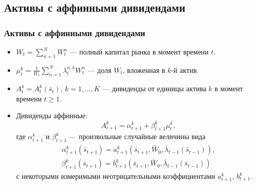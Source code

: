 \documentclass[10pt]{beamer}
\theoremstyle{definition}
\theoremstyle{remark}
\begin{document}
\subsection{Активы с аффинными дивидендами}
\begin{frame}\frametitle{Активы с аффинными дивидендами}
    \begin{itemize}
    \item $W_t = \sum_{n=1}^N W_t^n$ — полный капитал рынка в момент времени $t$.
    \item $\mu_{t}^k = \frac{1}{W_t}\sum_{n=1}^{N}\lambda_{t}^{n,k} W_t^n$ — доля $W_t$, вложенная в $k$-й актив.
    \item $A_{t}^k = A_{t}^k(  \bar s_{t} )$, $k=1,\dots,K$ — дивиденды от единицы актива $k$ в момент времени $t\ge 1$.
   
    \item Дивиденды аффинные:
    $$
    \label{6-A-t-k-affine}
    A_{t+1}^k = \alpha_{t+1}^k + \beta_{t+1}^k \mu_{t}^k,
    $$
    где $\alpha_{t+1}^k$ и $\beta_{t+1}^k$ — произвольные случайные величины вида
    \begin{gather}
    \label{7-alpha-t-k}
    \alpha_{t+1}^k( \bar s_{t+1}) = a_{t+1}^k( \bar s_{t+1}, \bar W_0, \bar \lambda_{t-1}( \bar s_{t-1} )), \\
    \label{8-beta-t-k}
    \beta_{t+1}^k( \bar s_{t+1} ) = b_{t+1}^k ( \bar s_{t+1},\bar W_0, \bar\lambda_{t-1}( \bar s_{t-1} ))
    \end{gather}
    с некоторыми измеримыми неотрицательными коэффициентами $a_{t+1}^k$, $b_{t+1}^k$.
    \end{itemize}
\end{frame}


\end{document}

